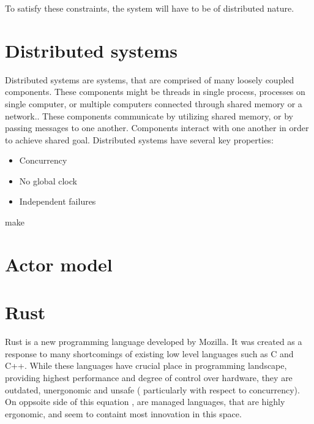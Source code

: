 To satisfy these constraints, the system will have to be of distributed nature.


\section{Distributed systems}
Distributed systems are systems, that are comprised of many loosely coupled components. These components might be threads
in single process, processes on single computer, or multiple computers connected through shared memory or a network..
These components communicate by utilizing shared memory, or by passing messages to one another. Components interact with
one another in order to achieve shared goal. Distributed systems have several key properties:

\begin{itemize}
    \item Concurrency
    \item No global clock
    \item Independent failures
\end{itemize}
make

\section{Actor model}
\section{Rust}
Rust is a new programming language developed by Mozilla. It was created as a response to many shortcomings of existing low level
languages such as C and C++. While these languages have crucial place in programming landscape, providing highest performance and
degree of control over hardware, they are outdated, unergonomic and unsafe ( particularly with respect to concurrency). On oppsoite
side of this equation , are managed languages, that are highly ergonomic, and seem to containt most innovation in this space.

